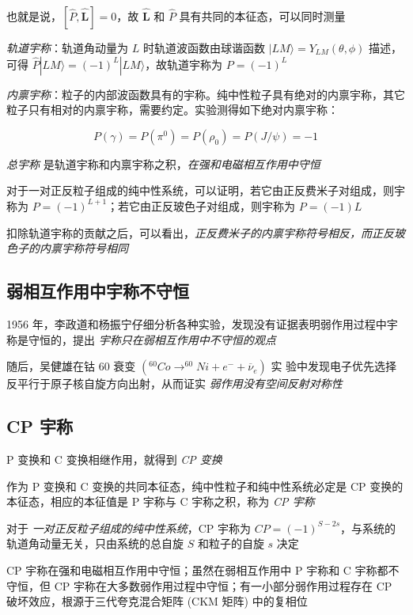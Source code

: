 也就是说，$[\hat{P}, \hat{\mathbf{L}}] = 0$，故 $\hat{\mathbf{L}}$ 和 $\hat{P}$ 具有共同的本征态，可以同时测量

\emph{轨道宇称}：轨道角动量为 $L$ 时轨道波函数由球谐函数 $|LM\rangle = Y_{LM} (\theta, \phi)$ 描述，可得 $\hat{P} |LM\rangle = (-1)^L |LM\rangle$，故轨道宇称为 $P = (-1)^L$

\emph{内禀宇称}：粒子的内部波函数具有的宇称。纯中性粒子具有绝对的内禀宇称，其它粒子只有相对的内禀宇称，需要约定。实验测得如下绝对内禀宇称：

\begin{equation}
    P(\gamma) = P(\pi^0) = P(\rho_0) = P(J/\psi) = -1
\end{equation}

\emph{总宇称} 是轨道宇称和内禀宇称之积，\emph{在强和电磁相互作用中守恒}

对于一对正反粒子组成的纯中性系统，可以证明，若它由正反费米子对组成，则宇称为 $P = (-1)^{L+1}$；若它由正反玻色子对组成，则宇称为 $P = (-1)L$

扣除轨道宇称的贡献之后，可以看出，\emph{正反费米子的内禀宇称符号相反，而正反玻色子的内禀宇称符号相同}

\subsection{弱相互作用中宇称不守恒}

1956 年，李政道和杨振宁仔细分析各种实验，发现没有证据表明弱作用过程中宇称是守恒的，提出 \emph{宇称只在弱相互作用中不守恒的观点}

随后，吴健雄在钴 60 衰变 $(^{60}Co \to ^{60}Ni + e^- + \overline{\nu}_e)$ 实 验中发现电子优先选择反平行于原子核自旋方向出射，从而证实 \emph{弱作用没有空间反射对称性}

\subsection{CP 宇称}

P 变换和 C 变换相继作用，就得到 \emph{CP 变换}

作为 P 变换和 C 变换的共同本征态，纯中性粒子和纯中性系统必定是 CP 变换的本征态，相应的本征值是 P 宇称与 C 宇称之积，称为 \emph{CP 宇称}

对于 \emph{一对正反粒子组成的纯中性系统}，CP 宇称为 $CP = (-1)^{S-2s}$，与系统的轨道角动量无关，只由系统的总自旋 $S$ 和粒子的自旋 $s$ 决定

CP 宇称在强和电磁相互作用中守恒；虽然在弱相互作用中 P 宇称和 C 宇称都不守恒，但 CP 宇称在大多数弱作用过程中守恒；有一小部分弱作用过程存在 CP 破坏效应，根源于三代夸克混合矩阵 (CKM 矩阵) 中的复相位


